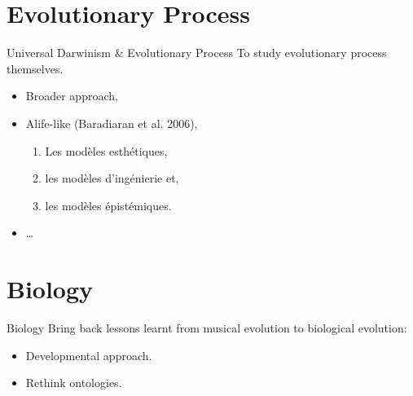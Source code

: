 \documentclass[8pt]{beamer}
\begin{document}
\section{Evolutionary Process}
\begin{frame}{Universal Darwinism \& Evolutionary Process}
	To study evolutionary process themselves. 
	\begin{itemize}
		\item Broader approach,
		\item Alife-like (Baradiaran et al. 2006),
			\begin{enumerate}
				\item Les modèles esthétiques, \label{it:est}
				\item les modèles d'ingénierie et,\label{it:ing}
				\item les modèles épistémiques. \label{it:epi}
			\end{enumerate}

		\item \ldots
	\end{itemize}

\end{frame}

\section{Biology}

\begin{frame}{Biology}
	Bring back lessons learnt from musical evolution to biological evolution:
	\begin{itemize}
		\item Developmental approach.
		\item Rethink ontologies.
	\end{itemize}

\end{frame}
\end{document}
